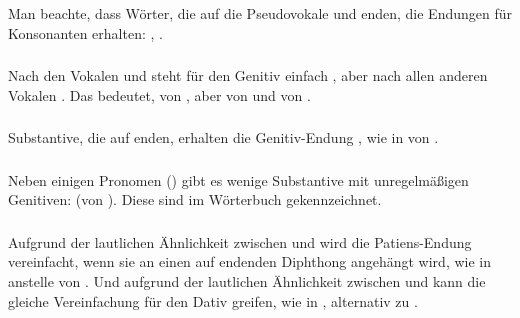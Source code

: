 

\subsubsection{} Man beachte, dass Wörter, die auf die Pseudovokale  und  enden, die Endungen für Konsonanten erhalten: , .
\label{morph:decl:pseudovowel}

\subsubsection{} Nach den Vokalen  und  steht für den Genitiv einfach , aber nach allen anderen Vokalen . Das bedeutet,  von , aber  von  und  von .

\subsubsection{} Substantive, die auf  enden, erhalten die Genitiv-Endung , wie in  von .

\subsubsection{} Neben einigen Pronomen () gibt es wenige Substantive mit unregelmäßigen Genitiven:  (von ). Diese sind im Wörterbuch gekennzeichnet.

\subsubsection{} Aufgrund der lautlichen Ähnlichkeit zwischen  und  wird die Patiens-Endung  vereinfacht, wenn sie an einen auf  endenden Diphthong angehängt wird, wie in   anstelle von . Und aufgrund der lautlichen Ähnlichkeit zwischen  und  kann die gleiche Vereinfachung für den Dativ  greifen, wie in  , alternativ zu .

